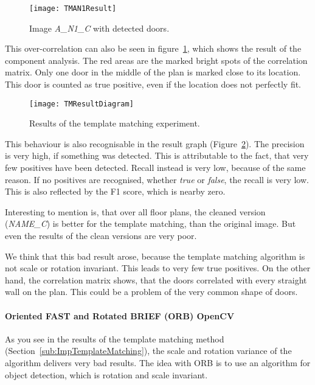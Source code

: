 \begin{figure}[H]
	\centering
	\texttt{[image: TMAN1Result]}
	\caption{Image \textit{A\_N1\_C} with detected doors.}
	\label{fig:TMAN1Result}
\end{figure}

This over-correlation can also be seen in figure~\ref{fig:TMAN1Result}, which shows the result of the component analysis. The red areas are the marked bright spots of the correlation matrix. Only one door in the middle of the plan is marked close to its location. This door is counted as true positive, even if the location does not perfectly fit.

\begin{figure}[H]
	\centering
	\texttt{[image: TMResultDiagram]}
	\caption{Results of the template matching experiment.}
	\label{fig:TMResultDiagram}
\end{figure}

This behaviour is also recognisable in the result graph (Figure~\ref{fig:TMResultDiagram}). The precision is very high, if something was detected. This is attributable to the fact, that very few positives have been detected. Recall instead is very low, because of the same reason. If no positives are recognised, whether \textit{true} or \textit{false}, the recall is very low. This is also reflected by the F1 score, which is nearby zero.

Interesting to mention is, that over all floor plans, the cleaned version (\textit{NAME\_C}) is better for the template matching, than the original image. But even the results of the clean versions are very poor.

We think that this bad result arose, because the template matching algorithm is not scale or rotation invariant. This leads to very few true positives. On the other hand, the correlation matrix shows, that the doors correlated with every straight wall on the plan. This could be a problem of the very common shape of doors.

\paragraph{Oriented FAST and Rotated BRIEF (ORB) OpenCV}
\label{sub:ImpORB}

As you see in the results of the template matching method (Section~\ref{sub:ImpTemplateMatching}), the scale and rotation variance of the algorithm delivers very bad results. The idea with ORB is to use an algorithm for object detection, which is rotation and scale invariant.

